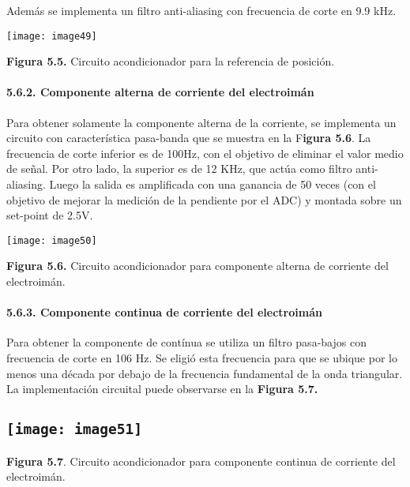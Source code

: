 \documentclass{article} %
\begin{document}
\noindent Adem\'{a}s se implementa un filtro anti-aliasing con frecuencia de corte en 9.9 kHz.

\noindent \texttt{[image: image49]}

\noindent \textbf{Figura 5.5. }Circuito acondicionador para la referencia de posici\'{o}n.

\noindent 
\paragraph{5.6.2. Componente  alterna de corriente del electroim\'{a}n}

\noindent Para obtener solamente la componente alterna de la corriente, se implementa un circuito con caracter\'{i}stica pasa-banda que se muestra en la F\textbf{igura 5.6}. La frecuencia de corte inferior  es de 100Hz, con el objetivo de eliminar el valor medio de se\~{n}al. Por otro lado, la superior es de 12 KHz, que act\'{u}a como filtro anti-aliasing. Luego la salida es amplificada con una ganancia de 50 veces (con el objetivo de mejorar la medici\'{o}n de la pendiente por el ADC) y montada sobre un set-point de 2.5V.

\noindent 

\noindent \texttt{[image: image50]}

\noindent \textbf{Figura 5.6. }Circuito acondicionador para componente alterna de corriente del electroim\'{a}n.\textbf{}

\noindent 
\paragraph{5.6.3. Componente  continua de corriente del electroim\'{a}n}

\noindent Para obtener la componente de cont\'{i}nua se utiliza un filtro pasa-bajos con frecuencia de corte en 106 Hz. Se eligi\'{o} esta frecuencia para que se ubique por lo menos una d\'{e}cada por debajo de la frecuencia fundamental de la onda triangular. La implementaci\'{o}n circuital puede observarse en la \textbf{Figura 5.7.}

\noindent 
\subsection{\texttt{[image: image51]}}

\noindent \textbf{Figura 5.7}. Circuito acondicionador para componente continua de corriente del electroim\'{a}n.
\end{document}
